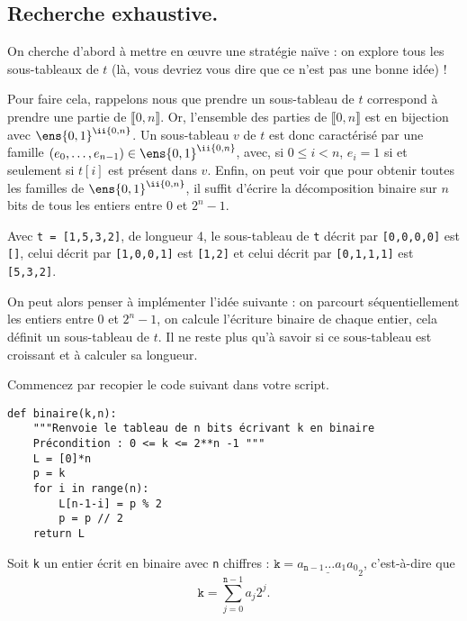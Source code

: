 \subsection{Recherche exhaustive.}

On cherche d'abord à mettre en {\oe}uvre une stratégie naïve : on explore tous les sous-tableaux de $t$ (là, vous devriez vous dire que ce n'est pas une bonne idée) ! 

Pour faire cela, rappelons nous que prendre un sous-tableau de $t$ correspond à prendre une partie de $\llbracket 0,n\rrbracket$. Or, l'ensemble des parties de $\llbracket 0,n \rrbracket$ est en bijection avec $\ens{0,1}^{\ii{0,n}}$.
Un sous-tableau $v$ de $t$ est donc caractérisé par une famille $\left(e_0,\dots,e_{n-1}\right) \in \ens{0,1}^{\ii{0,n}}$, avec, si $0\leq i < n$, $e_i = 1$ si et seulement si $t[i]$ est présent dans $v$.
Enfin, on peut voir que pour obtenir toutes les familles de $ \ens{0,1}^{\ii{0,n}}$, il suffit d'écrire la décomposition binaire sur $n$ bits de tous les entiers entre $0$ et $2^n-1$. 

\begin{exemple}
  Avec \texttt{t = [1,5,3,2]}, de longueur 4, le sous-tableau de \texttt{t} décrit par \texttt{[0,0,0,0]} est \texttt{[]}, celui décrit par \texttt{[1,0,0,1]} est \texttt{[1,2]} et celui décrit par \texttt{[0,1,1,1]} est \texttt{[5,3,2]}.
\end{exemple}


On peut alors penser à implémenter l'idée suivante : on parcourt séquentiellement les entiers entre $0$ et $2^n-1$, on calcule l'écriture binaire de chaque entier, cela définit un sous-tableau de $t$.
Il ne reste plus qu'à savoir si ce sous-tableau est croissant et à calculer sa longueur. 

\medskip{}

Commencez par recopier le code suivant dans votre script. 

\begin{lstlisting}
def binaire(k,n):
    """Renvoie le tableau de n bits écrivant k en binaire
    Précondition : 0 <= k <= 2**n -1 """
    L = [0]*n
    p = k
    for i in range(n):
        L[n-1-i] = p % 2
        p = p // 2
    return L
\end{lstlisting}

\medskip{}

Soit \texttt{k} un entier écrit en binaire avec \texttt{n} chiffres : $\texttt{k} = \underline{a_{\texttt{n}-1}\ldots a_{1}a_{0}}_{2}$, c'est-à-dire que 
\begin{equation*}
  \texttt{k} = \sum_{j=0}^{\texttt{n}-1} a_j 2^j.
\end{equation*}

